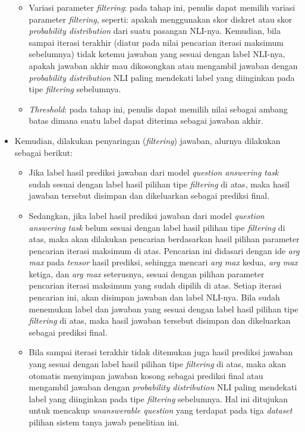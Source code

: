 \begin{itemize}
\begin{itemize}
        \item Variasi parameter \emph{filtering}: pada tahap ini, penulis dapat memilih variasi parameter \emph{filtering}, seperti: apakah menggunakan skor diskret atau skor \emph{probability distribution} dari suatu pasangan NLI-nya. Kemudian, bila sampai iterasi terakhir (diatur pada nilai pencarian iterasi maksimum sebelumnya) tidak ketemu jawaban yang sesuai dengan label NLI-nya, apakah jawaban akhir mau dikosongkan atau mengambil jawaban dengan \emph{probability distribution} NLI paling mendekati label yang diinginkan pada tipe \emph{filtering} sebelumnya.

        \item \emph{Threshold}: pada tahap ini, penulis dapat memilih nilai sebagai ambang batas dimana suatu label dapat diterima sebagai jawaban akhir.
        
    \end{itemize}
    
    \item Kemudian, dilakukan penyaringan (\emph{filtering}) jawaban, alurnya dilakukan sebagai berikut:
    
    \begin{itemize}
        
        \item Jika label hasil prediksi jawaban dari model \emph{question answering task} sudah sesuai dengan label hasil pilihan tipe \emph{filtering} di atas, maka hasil jawaban tersebut disimpan dan dikeluarkan sebagai prediksi final.
        
        \item Sedangkan, jika label hasil prediksi jawaban dari model \emph{question answering task} belum sesuai dengan label hasil pilihan tipe \emph{filtering} di atas, maka akan dilakukan pencarian berdasarkan hasil pilihan parameter pencarian iterasi maksimum di atas. Pencarian ini didasari dengan ide \emph{arg max} pada \emph{tensor} hasil prediksi, sehingga mencari \emph{arg max} kedua, \emph{arg max} ketiga, dan \emph{arg max} seterusnya, sesuai dengan pilihan parameter pencarian iterasi maksimum yang sudah dipilih di atas. Setiap iterasi pencarian ini, akan disimpan jawaban dan label NLI-nya. Bila sudah menemukan label dan jawaban yang sesuai dengan label hasil pilihan tipe \emph{filtering} di atas, maka hasil jawaban tersebut disimpan dan dikeluarkan sebagai prediksi final.
        
        \item Bila sampai iterasi terakhir tidak ditemukan juga hasil prediksi jawaban yang sesuai dengan label hasil pilihan tipe \emph{filtering} di atas, maka akan otomatis menyimpan jawaban kosong sebagai prediksi final atau mengambil jawaban dengan \emph{probability distribution} NLI paling mendekati label yang diinginkan pada tipe \emph{filtering} sebelumnya. Hal ini ditujukan untuk mencakup \emph{unanswerable question} yang terdapat pada tiga \emph{dataset} pilihan sistem tanya jawab penelitian ini.
        

\end{itemize}
\end{itemize}
